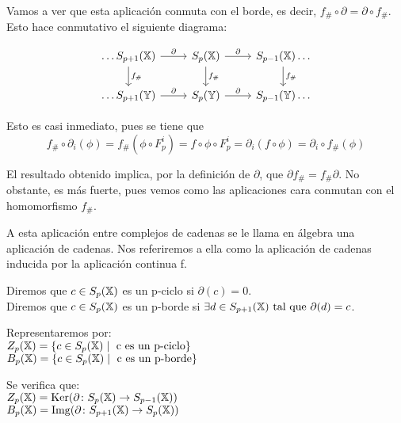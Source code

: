 Vamos a ver que esta aplicación conmuta con el borde, es decir, $f_\# \circ \partial = \partial \circ f_\#$. Esto hace conmutativo el siguiente diagrama:

\begin{centering}
  \begin{displaymath}
    \begin{tikzcd}
      \dots S_{p+1}(\X) \arrow{r}{\partial} \arrow{d}{f_\#} & S_p(\X) \arrow{r}{\partial} \arrow{d}{f_\#} & S_{p-1}(\X) \arrow{d}{f_\#} \dots \\
      \dots S_{p+1}(\Y) \arrow{r}{\partial}                 & S_p(\Y) \arrow{r}{\partial}                 & S_{p-1}(\Y) \dots
    \end{tikzcd}
  \end{displaymath}
\end{centering}

Esto es casi inmediato, pues se tiene que \[ f_\# \circ \partial_i(\phi) = f_\#(\phi \circ F_p^i) = f \circ \phi \circ F_p^i
                                             = \partial_i(f \circ \phi) = \partial_i \circ f_\#(\phi) \]

El resultado obtenido implica, por la definición de $\partial$, que $\partial f_\# = f_\# \partial$. No obstante, es más fuerte, pues vemos
como las aplicaciones cara conmutan con el homomorfismo $f_\#$.

A esta aplicación entre complejos de cadenas se le llama en álgebra una aplicación de cadenas. Nos referiremos a ella como la aplicación de cadenas
inducida por la aplicación continua f.

\begin{definition}
  Diremos que $c \in S_p({\mathbb X})$ es un p-ciclo si $\partial(c) = 0$. \\
  Diremos que $c \in S_p({\mathbb X})$ es un p-borde si $\exists d \in S_{p+1}({\mathbb X}) \text{ tal que } \partial(d) = c$.
\end{definition}


Representaremos por: \\
$Z_p({\mathbb X}) = \{c \in S_p({\mathbb X}) \mid \text{ c es un p-ciclo}\}$ \\
$B_p({\mathbb X}) = \{c \in S_p({\mathbb X}) \mid \text{ c es un p-borde}\} $

Se verifica que: \\
$Z_p({\mathbb X}) = \operatorname{Ker} (\partial \colon S_p({\mathbb X}) \to S_{p-1}({\mathbb X})) $ \\
$B_p({\mathbb X}) = \operatorname{Img} (\partial \colon S_{p+1}({\mathbb X}) \to S_p({\mathbb X})) $

